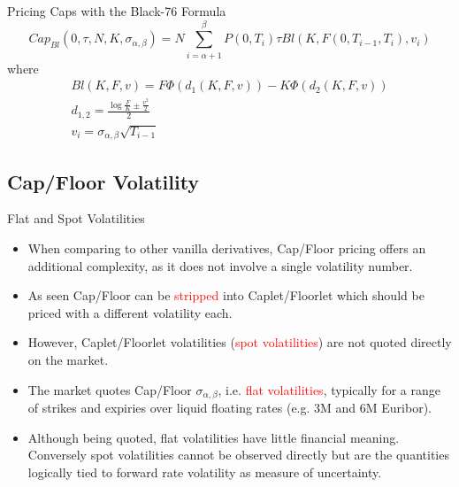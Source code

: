 \documentclass{beamer}
\begin{document}
\begin{frame}{Pricing Caps with the Black-76 Formula}
	\begin{equation}
		Cap_{Bl}(0, \tau,N,K,\sigma_{\alpha,\beta}) = N\sum_{i=\alpha+1}^{\beta}P(0,T_i)\tau Bl(K,F(0,T_{i-1},T_i),v_i)
	\end{equation}
	where
	\begin{equation*}
		\begin{gathered}
		Bl(K,F,v)=F\Phi(d_1(K,F,v)) - K\Phi(d_2(K,F,v)) \\
		d_{1,2} = \frac{\log{\frac{F}{K}} \pm \frac{v^2}{2}}{2} \\
		v_i = \sigma_{\alpha,\beta}\sqrt{T_{i-1}}	
		\end{gathered}
	\end{equation*}
\end{frame}

\subsection{Cap/Floor Volatility}
\begin{frame}{Flat and Spot Volatilities}
	\begin{itemize}
		\item When comparing to other vanilla derivatives, Cap/Floor pricing offers an additional complexity, as it does not involve a single volatility number. 
		\item As seen Cap/Floor can be \textcolor{red}{stripped} into Caplet/Floorlet which should be priced with a different volatility each. 
		\item However, Caplet/Floorlet volatilities (\textcolor{red}{spot volatilities}) are not quoted directly on the market.
		\item The market quotes Cap/Floor $\sigma_{\alpha,\beta}$, i.e. \textcolor{red}{flat volatilities}, typically for a range of strikes and expiries over liquid floating rates (e.g. 3M and 6M Euribor).
		\item Although being quoted, flat volatilities have little financial meaning. Conversely spot volatilities cannot be observed directly but are the quantities logically tied to forward rate volatility as measure of uncertainty.
	\end{itemize}
\end{frame}
\end{document}
